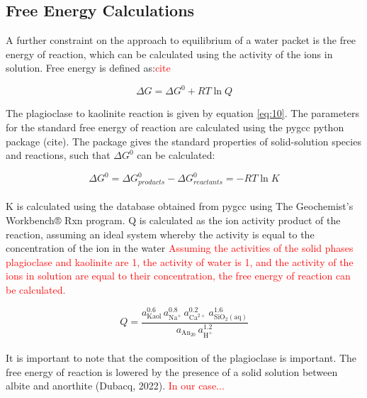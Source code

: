 \newpage



\subsection{Free Energy Calculations}

A further constraint on the approach to equilibrium of a water packet is the free energy of reaction, which can be calculated using the activity of the ions in solution. Free energy is defined as:\textcolor{red}{cite}

\begin{equation}
    \Delta G = \Delta G^0 + RT \ln Q
\end{equation}

The plagioclase to kaolinite reaction is given by equation \ref{eq:10}. The parameters for the standard free energy of reaction are calculated using the pygcc python package (cite). The package gives the standard properties of solid-solution species and reactions, such that $\Delta G^0$ can be calculated:

\begin{equation}
    \Delta G^0 = \Delta G^0_{products} - \Delta G^0_{reactants} = -RT \ln K
\end{equation}\\
K is calculated using the database obtained from pygcc using The Geochemist's Workbench® Rxn program. Q is calculated as the ion activity product of the reaction, assuming an ideal system whereby the activity is equal to the concentration of the ion in the water \textcolor{red}{Assuming the activities of the solid phases plagioclase and kaolinite are 1, the activity of water is 1, and the activity of the ions in solution are equal to their concentration, the free energy of reaction can be calculated. }

\begin{equation}
    Q = \frac{a_{\mathrm{Kaol}}^{0.6}\,a_{\mathrm{Na}^{+}}^{0.8}\,a_{\mathrm{Ca}^{2+}}^{0.2}\,a_{\mathrm{SiO_{2}(aq)}}^{1.6}}
           {a_{\mathrm{An_{20}}}\,a_{\mathrm{H}^{+}}^{1.2}}
\end{equation}\\

It is important to note that the composition of the plagioclase is important. The free energy of reaction is lowered by the presence of a solid solution between albite and anorthite (Dubacq, 2022). \textcolor{red}{In our case...}

\newpage

